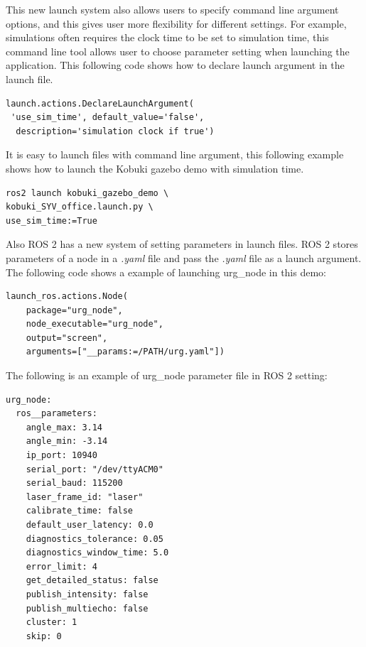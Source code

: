 \documentclass[letterpaper, 10 pt, conference]{ieeeconf}  %
\begin{document}
This new launch system also allows users to specify command line argument options, and this gives user more flexibility for different settings. For example, simulations often requires the clock time to be set to simulation time, this command line tool allows user to choose parameter setting when launching the application. This following code shows how to declare launch argument in the launch file. 
\begin{small}
\begin{verbatim}
launch.actions.DeclareLaunchArgument(
 'use_sim_time', default_value='false',
  description='simulation clock if true')
\end{verbatim}
\end{small}
\par\vspace{1pt}
It is easy to launch files with command line argument, this following example shows how to launch the Kobuki gazebo demo with simulation time. 
\begin{small}
\begin{verbatim}
ros2 launch kobuki_gazebo_demo \ 
kobuki_SYV_office.launch.py \ 
use_sim_time:=True
\end{verbatim}
\end{small}
\par\vspace{1pt}
Also ROS 2 has a new system of setting parameters in launch files. ROS 2 stores parameters of a node in a \textit{.yaml} file and pass the \textit{.yaml} file as a launch argument. The following code shows a example of launching urg\_node in this demo: \par\vspace{2pt}
\begin{small}
\begin{verbatim}
launch_ros.actions.Node(
    package="urg_node",
    node_executable="urg_node",
    output="screen",
    arguments=["__params:=/PATH/urg.yaml"])
\end{verbatim}
\end{small}\par\vspace{2pt}
The following is an example of urg\_node parameter file in ROS 2 setting: 
\begin{small}
\begin{verbatim}
urg_node:
  ros__parameters:
    angle_max: 3.14
    angle_min: -3.14
    ip_port: 10940
    serial_port: "/dev/ttyACM0"
    serial_baud: 115200
    laser_frame_id: "laser"
    calibrate_time: false
    default_user_latency: 0.0
    diagnostics_tolerance: 0.05
    diagnostics_window_time: 5.0
    error_limit: 4
    get_detailed_status: false
    publish_intensity: false
    publish_multiecho: false
    cluster: 1
    skip: 0
\end{verbatim}
\end{small}{}
\end{document}
